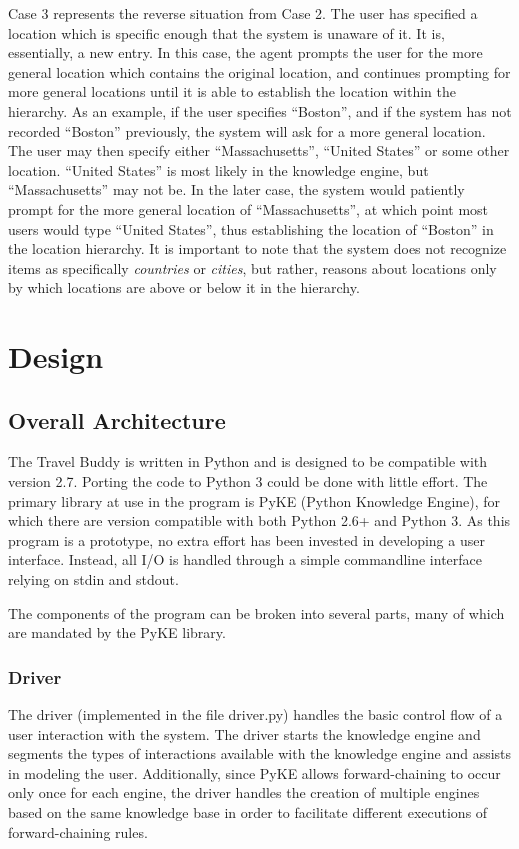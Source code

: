 \documentclass[11pt]{article} %
\begin{document}
Case 3 represents the reverse situation from Case 2. The user has specified a location which is specific enough that the system is unaware of it. It is, essentially, a new entry. In this case, the agent prompts the user for the more general location which contains the original location, and continues prompting for more general locations until it is able to establish the location within the hierarchy. As an example, if the user specifies ``Boston'', and if the system has not recorded ``Boston'' previously, the system will ask for a more general location. The user may then specify either ``Massachusetts'', ``United States'' or some other location. ``United States'' is most likely in the knowledge engine, but ``Massachusetts'' may not be. In the later case, the system would patiently prompt for the more general location of ``Massachusetts'', at which point most users would type ``United States'', thus establishing the location of ``Boston'' in the location hierarchy. It is important to note that the system does not recognize items as specifically \emph{countries} or \emph{cities}, but rather, reasons about locations only by which locations are above or below it in the hierarchy. 

\section{Design}
\subsection{Overall Architecture}
The Travel Buddy is written in Python and is designed to be
compatible with version 2.7. Porting the code to
Python 3 could be done with little effort. The primary
library at use in the program is PyKE (Python Knowledge
Engine), for which there are version compatible with both
Python 2.6+ and Python 3. As this program is a prototype,
no extra effort has been invested in developing a
user interface. Instead, all I/O is handled through a simple
commandline interface relying on stdin and stdout.

The components of the program can be broken into several
parts, many of which are mandated by the PyKE library.

\subsubsection{Driver}
The driver (implemented in the file driver.py) handles the
basic control flow of a user interaction with the system.
The driver starts the knowledge engine and 
segments the types of interactions available
with the knowledge engine and assists in modeling the
user. Additionally, since PyKE allows forward-chaining to
occur only once for each engine, the driver handles the
creation of multiple engines based on the same knowledge
base in order to facilitate different executions of
forward-chaining rules.
\end{document}
